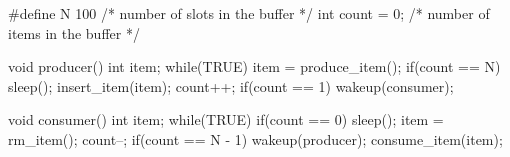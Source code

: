 \documentclass[varwidth=25.2em,crop]{standalone}
\begin{document}
\begin{ccode}
#define N 100  /* number of slots in the buffer */
int count = 0; /* number of items in the buffer */  
\end{ccode}
\begin{minipage}{.49\linewidth}
  \begin{ccode}
void producer(){
  int item;
  while(TRUE){
    item = produce_item();
    if(count == N)
      sleep();
    insert_item(item);
    count++;
    if(count == 1)
      wakeup(consumer);
  }
}
  \end{ccode}
\end{minipage}\hfill
\begin{minipage}{.49\linewidth}
  \begin{ccode}
void consumer(){
  int item;
  while(TRUE){
    if(count == 0)
      sleep();
    item = rm_item();
    count--;
    if(count == N - 1)
      wakeup(producer);
    consume_item(item);
  }
}
  \end{ccode}
\end{minipage}
\end{document}
